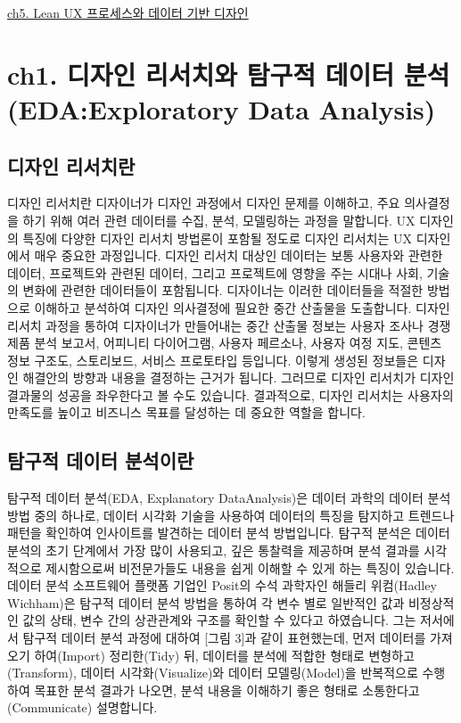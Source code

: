 \documentclass[
  letterpaper,
]{book}
\begin{document}
\href{ch5.\%20Lean\%20UX\%20프로세스와\%20데이터\%20기반\%20디자인.qmd}{ch5.
Lean UX 프로세스와 데이터 기반 디자인}

\chapter{ch1. 디자인 리서치와 탐구적 데이터 분석 (EDA:Exploratory Data
Analysis)}\label{ch1.-uxb514uxc790uxc778-uxb9acuxc11cuxce58uxc640-uxd0d0uxad6cuxc801-uxb370uxc774uxd130-uxbd84uxc11d-edaexploratory-data-analysis}

\section{디자인
리서치란}\label{uxb514uxc790uxc778-uxb9acuxc11cuxce58uxb780}

디자인 리서치란 디자이너가 디자인 과정에서 디자인 문제를 이해하고, 주요
의사결정을 하기 위해 여러 관련 데이터를 수집, 분석, 모델링하는 과정을
말합니다. UX 디자인의 특징에 다양한 디자인 리서치 방법론이 포함될 정도로
디자인 리서치는 UX 디자인에서 매우 중요한 과정입니다. 디자인 리서치
대상인 데이터는 보통 사용자와 관련한 데이터, 프로젝트와 관련된 데이터,
그리고 프로젝트에 영향을 주는 시대나 사회, 기술의 변화에 관련한
데이터들이 포함됩니다. 디자이너는 이러한 데이터들을 적절한 방법으로
이해하고 분석하여 디자인 의사결정에 필요한 중간 산출물을 도출합니다.
디자인 리서치 과정을 통하여 디자이너가 만들어내는 중간 산출물 정보는
사용자 조사나 경쟁 제품 분석 보고서, 어피니티 다이어그램, 사용자
페르소나, 사용자 여정 지도, 콘텐츠 정보 구조도, 스토리보드, 서비스
프로토타입 등입니다. 이렇게 생성된 정보들은 디자인 해결안의 방향과
내용을 결정하는 근거가 됩니다. 그러므로 디자인 리서치가 디자인 결과물의
성공을 좌우한다고 볼 수도 있습니다. 결과적으로, 디자인 리서치는 사용자의
만족도를 높이고 비즈니스 목표를 달성하는 데 중요한 역할을 합니다.

\section{탐구적 데이터
분석이란}\label{uxd0d0uxad6cuxc801-uxb370uxc774uxd130-uxbd84uxc11duxc774uxb780}

탐구적 데이터 분석(EDA, Explanatory DataAnalysis)은 데이터 과학의 데이터
분석 방법 중의 하나로, 데이터 시각화 기술을 사용하여 데이터의 특징을
탐지하고 트렌드나 패턴을 확인하여 인사이트를 발견하는 데이터 분석
방법입니다. 탐구적 분석은 데이터 분석의 초기 단계에서 가장 많이
사용되고, 깊은 통찰력을 제공하며 분석 결과를 시각적으로 제시함으로써
비전문가들도 내용을 쉽게 이해할 수 있게 하는 특징이 있습니다. 데이터
분석 소프트웨어 플랫폼 기업인 Posit의 수석 과학자인 해들리 위컴(Hadley
Wichham)은 탐구적 데이터 분석 방법을 통하여 각 변수 별로 일반적인 값과
비정상적인 값의 상태, 변수 간의 상관관계와 구조를 확인할 수 있다고
하였습니다. 그는 저서에서 탐구적 데이터 분석 과정에 대하여 {[}그림
3{]}과 같이 표현했는데, 먼저 데이터를 가져오기 하여(Import) 정리한(Tidy)
뒤, 데이터를 분석에 적합한 형태로 변형하고(Transform), 데이터
시각화(Visualize)와 데이터 모델링(Model)을 반복적으로 수행하여 목표한
분석 결과가 나오면, 분석 내용을 이해하기 좋은 형태로
소통한다고(Communicate) 설명합니다.
\end{document}
